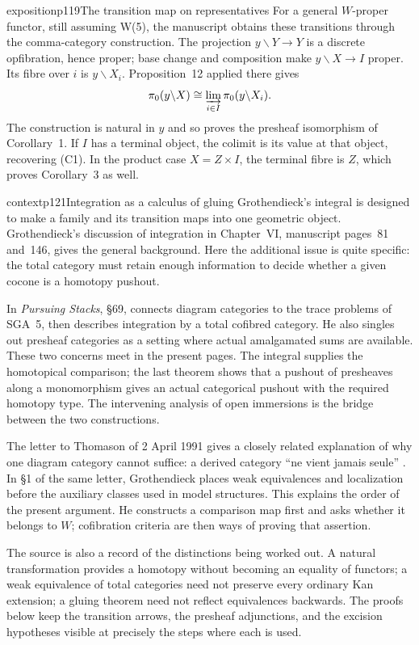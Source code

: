 \begin{dcomment}{exposition}{p119}{The transition map on representatives}
For a general $W$-proper functor, still assuming W(5), the manuscript obtains these transitions through the comma-category construction. The projection $y\backslash Y\to Y$ is a discrete opfibration, hence proper; base change and composition make $y\backslash X\to I$ proper. Its fibre over $i$ is $y\backslash X_i$. Proposition~12 applied there gives
\[
 \pi_0(y\backslash X)
   \cong\varinjlim_{i\in I}\pi_0(y\backslash X_i).
\]
The construction is natural in $y$ and so proves the presheaf isomorphism of Corollary~1. If $I$ has a terminal object, the colimit is its value at that object, recovering (C1). In the product case $X=Z\times I$, the terminal fibre is $Z$, which proves Corollary~3 as well.
\end{dcomment}

\begin{dcomment}{context}{p121}{Integration as a calculus of gluing}
Grothendieck's integral is designed to make a family and its transition maps into one geometric object. Grothendieck's discussion of integration in Chapter~VI, manuscript pages~81 and~146, gives the general background. Here the additional issue is quite specific: the total category must retain enough information to decide whether a given cocone is a homotopy pushout.

In \emph{Pursuing Stacks}, \S69, \citet{Grothendieck1983} connects diagram categories to the trace problems of SGA~5, then describes integration by a total cofibred category. He also singles out presheaf categories as a setting where actual amalgamated sums are available. These two concerns meet in the present pages. The integral supplies the homotopical comparison; the last theorem shows that a pushout of presheaves along a monomorphism gives an actual categorical pushout with the required homotopy type. The intervening analysis of open immersions is the bridge between the two constructions.

The letter to Thomason of 2 April 1991 gives a closely related explanation of why one diagram category cannot suffice: a derived category ``ne vient jamais seule'' \citep[\S2]{Grothendieck1991Letter}. In \S1 of the same letter, Grothendieck places weak equivalences and localization before the auxiliary classes used in model structures. This explains the order of the present argument. He constructs a comparison map first and asks whether it belongs to $W$; cofibration criteria are then ways of proving that assertion.

The source is also a record of the distinctions being worked out. A natural transformation provides a homotopy without becoming an equality of functors; a weak equivalence of total categories need not preserve every ordinary Kan extension; a gluing theorem need not reflect equivalences backwards. The proofs below keep the transition arrows, the presheaf adjunctions, and the excision hypotheses visible at precisely the steps where each is used.
\end{dcomment}

